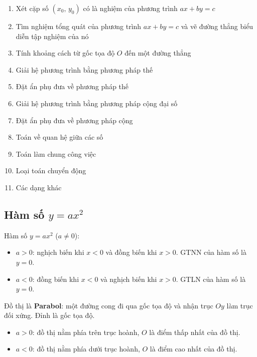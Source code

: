 \documentclass[12pt,a4paper]{article}
\begin{document}
\begin{enumerate}[label=\textbf{Dạng \arabic*:}, leftmargin=*, align=left]
  \item Xét cặp số $(x_0,\, y_0)$ có là nghiệm của phương trình $ax + by = c$
  \item Tìm nghiệm tổng quát của phương trình $ax + by = c$ và vẽ đường thẳng biểu diễn tập nghiệm của nó
  \item Tính khoảng cách từ gốc tọa độ $O$ đến một đường thẳng
  \item Giải hệ phương trình bằng phương pháp thế
  \item Đặt ẩn phụ đưa về phương pháp thế
  \item Giải hệ phương trình bằng phương pháp cộng đại số
  \item Đặt ẩn phụ đưa về phương pháp cộng
  \item Toán về quan hệ giữa các số
  \item Toán làm chung công việc
  \item Loại toán chuyển động
  \item Các dạng khác
\end{enumerate}

\subsection{Hàm số $y = ax^2$}

\begin{dinhnghia}
  Hàm số $y = ax^2$ \quad ($a \neq 0$):
  \begin{itemize}
    \item $a > 0$: nghịch biến khi $x < 0$ và đồng biến khi $x > 0$. GTNN của hàm số là $y = 0$.
    \item $a < 0$: đồng biến khi $x < 0$ và nghịch biến khi $x > 0$. GTLN của hàm số là $y = 0$.
  \end{itemize}
\end{dinhnghia}

\begin{tinhchat}
  Đồ thị là \textbf{Parabol}: một đường cong đi qua gốc tọa độ và nhận trục $Oy$ làm trục đối xứng. Đỉnh là gốc tọa độ.
  \begin{itemize}
    \item $a > 0$: đồ thị nằm phía trên trục hoành, $O$ là điểm thấp nhất của đồ thị.
    \item $a < 0$: đồ thị nằm phía dưới trục hoành, $O$ là điểm cao nhất của đồ thị.
  \end{itemize}
\end{tinhchat}
\end{document}
